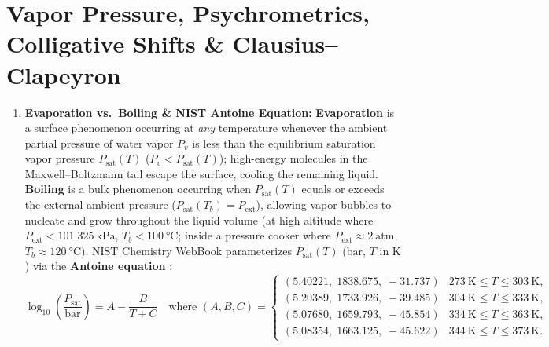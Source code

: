 \section{Vapor Pressure, Psychrometrics, Colligative Shifts \& Clausius--Clapeyron}
\label{sec:05.5}

\begin{enumerate}
  \item \textbf{Evaporation vs.\ Boiling \& NIST Antoine Equation:}
  \textbf{Evaporation} is a surface phenomenon occurring at \emph{any} temperature whenever the ambient partial pressure of water vapor $P_v$ is less than the equilibrium saturation vapor pressure $P_{\mathrm{sat}}(T)$ ($P_v < P_{\mathrm{sat}}(T)$); high-energy molecules in the Maxwell--Boltzmann tail escape the surface, cooling the remaining liquid. \textbf{Boiling} is a bulk phenomenon occurring when $P_{\mathrm{sat}}(T)$ equals or exceeds the external ambient pressure ($P_{\mathrm{sat}}(T_b) = P_{\mathrm{ext}}$), allowing vapor bubbles to nucleate and grow throughout the liquid volume (at high altitude where $P_{\mathrm{ext}} < \SI{101.325}{\kilo\pascal}$, $T_b < \SI{100}{\celsius}$; inside a pressure cooker where $P_{\mathrm{ext}} \approx \SI{2}{\text{atm}}$, $T_b \approx \SI{120}{\celsius}$). NIST Chemistry WebBook parameterizes $P_{\mathrm{sat}}(T)$ ($\si{\text{bar}}$, $T$ in $\si{\kelvin}$) via the \textbf{Antoine equation} :
  \begin{equation}\label{eq:05:antoine}
    \log_{10}\!\left(\frac{P_{\mathrm{sat}}}{\si{\text{bar}}}\right) = A - \frac{B}{T + C}
    \quad\text{where } (A,B,C) = \begin{cases}
      (5.40221,\; 1838.675,\; -31.737) & \SI{273}{\kelvin} \le T \le \SI{303}{\kelvin}, \\
      (5.20389,\; 1733.926,\; -39.485) & \SI{304}{\kelvin} \le T \le \SI{333}{\kelvin}, \\
      (5.07680,\; 1659.793,\; -45.854) & \SI{334}{\kelvin} \le T \le \SI{363}{\kelvin}, \\
      (5.08354,\; 1663.125,\; -45.622) & \SI{344}{\kelvin} \le T \le \SI{373}{\kelvin}.
    \end{cases}
  \end{equation}

\end{enumerate}
